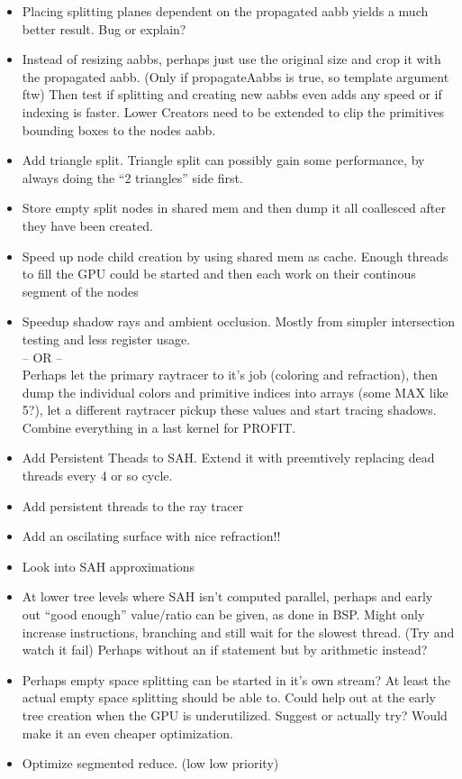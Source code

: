 \begin{itemize}
\item Placing splitting planes dependent on the propagated aabb yields
  a much better result. Bug or explain? 
\item Instead of resizing aabbs, perhaps just use the original size
  and crop it with the propagated aabb. (Only if propagateAabbs is
  true, so template argument ftw) Then test if splitting and creating
  new aabbs even adds any speed or if indexing is faster. Lower
  Creators need to be extended to clip the primitives bounding boxes
  to the nodes aabb.
\item Add triangle split. Triangle split can possibly gain
  some performance, by always doing the ``2 triangles'' side first.
\item Store empty split nodes in shared mem and then dump it all
  coallesced after they have been created.
\item Speed up node child creation by using shared mem as
  cache. Enough threads to fill the GPU could be started and then each
  work on their continous segment of the nodes
\item Speedup shadow rays and ambient occlusion. Mostly from simpler
  intersection testing and less register usage.\\ -- OR -- \\ Perhaps
  let the primary raytracer to it's job (coloring and refraction),
  then dump the individual colors and primitive indices into arrays
  (some MAX like 5?), let a different raytracer pickup these values
  and start tracing shadows. Combine everything in a last kernel for
  PROFIT.
\item Add Persistent Theads to SAH. Extend it with preemtively
  replacing dead threads every 4 or so cycle.
\item Add persistent threads to the ray tracer
\item Add an oscilating surface with nice refraction!!
\item Look into SAH approximations
\item At lower tree levels where SAH isn't computed parallel, perhaps
  and early out ``good enough'' value/ratio can be given, as done in
  BSP. Might only increase instructions, branching and still wait for
  the slowest thread. (Try and watch it fail) Perhaps without an if
  statement but by arithmetic instead?
\item Perhaps empty space splitting can be started in it's own stream?
  At least the actual empty space splitting should be able to. Could
  help out at the early tree creation when the GPU is
  underutilized. Suggest or actually try? Would make it an even
  cheaper optimization.
\item Optimize segmented reduce. (low low priority)
\end{itemize}




